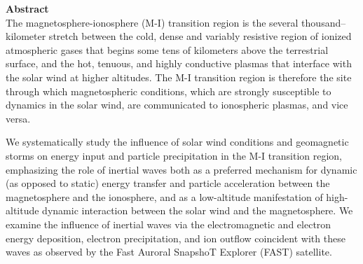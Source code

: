 
\vspace*{1in}
{\Huge \bf Abstract} \\

The magnetosphere-ionosphere (M-I) transition region is the several
thousand--kilometer stretch between the cold, dense and variably
resistive region of ionized atmospheric gases that begins some tens of
kilometers above the terrestrial surface, and the hot, tenuous, and
highly conductive plasmas that interface with the solar wind at higher
altitudes. The M-I transition region is therefore the site through
which magnetospheric conditions, which are strongly susceptible to
dynamics in the solar wind, are communicated to ionospheric plasmas,
and vice versa.

We systematically study the influence of solar wind conditions and
geomagnetic storms on energy input and particle precipitation in the
M-I transition region, emphasizing the role of inertial \Alf waves
both as a preferred mechanism for dynamic (as opposed to static)
energy transfer and particle acceleration between the magnetosphere
and the ionosphere, and as a low-altitude manifestation of
high-altitude dynamic interaction between the solar wind and the
magnetosphere. We examine the influence of inertial \Alf waves via the
electromagnetic and electron energy deposition, electron
precipitation, and ion outflow coincident with these waves as observed
by the Fast Auroral SnapshoT Explorer (FAST) satellite. 

